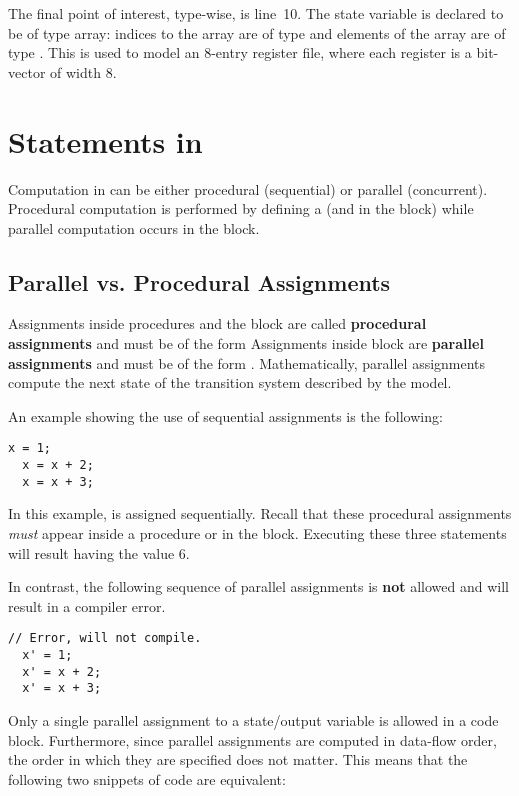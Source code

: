 The final point of interest, type-wise, is line~10. The state variable  is declared to be of type array: indices to the array are of type  and elements of the array are of type . This is used to model an 8-entry register file, where each register is a bit-vector of width 8.

\section{Statements in \uclid{}}

Computation in \uclid{} can be either procedural (sequential) or parallel (concurrent). Procedural computation is performed by defining a  (and in the  block) while parallel computation occurs in the  block.

\subsection{Parallel vs. Procedural Assignments}
Assignments inside procedures and the  block are called \textbf{procedural assignments} and must be of the form  Assignments inside  block are \textbf{parallel assignments} and must be of the form . Mathematically, parallel assignments compute the next state of the transition system described by the model.

An example showing the use of sequential assignments is the following:

\begin{lstlisting}[language=uclid,style=uclidstyle]
  x = 1;
  x = x + 2;
  x = x + 3;
\end{lstlisting}

	In this example,  is assigned sequentially.  Recall that these procedural assignments \emph{must} appear inside a procedure or in the  block. Executing these three statements will result  having the value 6.

    In contrast, the following sequence of parallel assignments is \textbf{not} allowed and will result in a compiler error.
\begin{lstlisting}[language=uclid,style=uclidstyle]
  // Error, will not compile.
  x' = 1;
  x' = x + 2;
  x' = x + 3;
\end{lstlisting}
Only a single parallel assignment to a state/output variable is allowed in a code block. Furthermore, since parallel assignments are computed in data-flow order, the order in which they are specified does not matter. This means that the following two snippets of code are equivalent:

